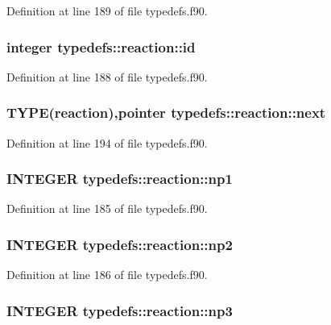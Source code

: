 Definition at line 189 of file typedefs.f90.\hypertarget{typetypedefs_1_1reaction_abf0098a01f9d2604a92c9c009fe5f4cd}{
\subsubsection[{id}]{\setlength{\rightskip}{0pt plus 5cm}integer {\bf typedefs::reaction::id}}}
\label{typetypedefs_1_1reaction_abf0098a01f9d2604a92c9c009fe5f4cd}


Definition at line 188 of file typedefs.f90.\hypertarget{typetypedefs_1_1reaction_a6daa057b231b087a532b86ae735acc49}{
\subsubsection[{next}]{\setlength{\rightskip}{0pt plus 5cm}TYPE({\bf reaction}),pointer {\bf typedefs::reaction::next}}}
\label{typetypedefs_1_1reaction_a6daa057b231b087a532b86ae735acc49}


Definition at line 194 of file typedefs.f90.\hypertarget{typetypedefs_1_1reaction_ac1c2c1f6500c0af1b6f16cb9d9ed6123}{
\subsubsection[{np1}]{\setlength{\rightskip}{0pt plus 5cm}INTEGER {\bf typedefs::reaction::np1}}}
\label{typetypedefs_1_1reaction_ac1c2c1f6500c0af1b6f16cb9d9ed6123}


Definition at line 185 of file typedefs.f90.\hypertarget{typetypedefs_1_1reaction_a155a3a9ab65f1065cb20ee3b756b222e}{
\subsubsection[{np2}]{\setlength{\rightskip}{0pt plus 5cm}INTEGER {\bf typedefs::reaction::np2}}}
\label{typetypedefs_1_1reaction_a155a3a9ab65f1065cb20ee3b756b222e}


Definition at line 186 of file typedefs.f90.\hypertarget{typetypedefs_1_1reaction_ac0e23b19e555b458e49a3f2c305fe5e9}{
\subsubsection[{np3}]{\setlength{\rightskip}{0pt plus 5cm}INTEGER {\bf typedefs::reaction::np3}}}
\label{typetypedefs_1_1reaction_ac0e23b19e555b458e49a3f2c305fe5e9}


